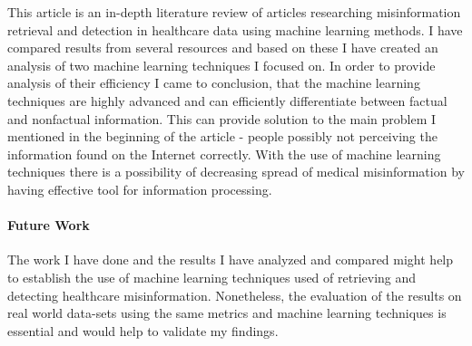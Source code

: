 \documentclass[11pt ,english,a4paper]{article}
\begin{document}
This article is an in-depth literature review of articles researching misinformation retrieval and detection in healthcare data using machine learning methods. I have compared results from several resources and based on these I have created an analysis of two machine learning techniques I focused on. In order to provide analysis of their efficiency I came to conclusion, that the machine learning techniques are highly advanced and can efficiently differentiate between factual and nonfactual information. This can provide solution to the main problem I mentioned in the beginning of the article - people possibly not perceiving the information found on the Internet correctly. With the use of machine learning techniques there is a possibility of decreasing spread of medical misinformation by having effective tool for information processing.

\paragraph{Future Work} The work I have done and the results I have analyzed and compared might help to establish the use of machine learning techniques used of retrieving and detecting healthcare misinformation. Nonetheless, the evaluation of the results on real world data-sets using the same metrics and machine learning techniques is essential and would help to validate my findings. 

\newpage


\end{document}
